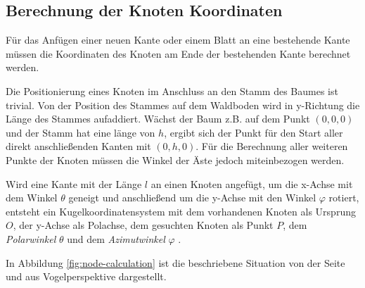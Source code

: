 \subsection{Berechnung der Knoten Koordinaten}

Für das Anfügen einer neuen Kante oder einem Blatt an eine bestehende Kante müssen die Koordinaten des Knoten am Ende der bestehenden Kante berechnet werden.
 
Die Positionierung eines Knoten im Anschluss an den Stamm des Baumes ist trivial. Von der Position des Stammes auf dem Waldboden wird in y-Richtung die Länge des Stammes aufaddiert. Wächst der Baum z.B. auf dem Punkt $(0, 0, 0)$ und der Stamm hat eine länge von $h$, ergibt sich der Punkt für den Start aller direkt anschließenden Kanten mit $(0, h, 0)$. Für die Berechnung aller weiteren Punkte der Knoten müssen die Winkel der Äste jedoch miteinbezogen werden.
  
Wird eine Kante mit der Länge $l$ an einen Knoten angefügt, um die x-Achse mit dem Winkel $\theta$ geneigt und anschließend um die y-Achse mit den Winkel $\varphi$ rotiert, entsteht ein Kugelkoordinatensystem mit dem vorhandenen Knoten als Ursprung $O$, der y-Achse als Polachse, dem gesuchten Knoten als Punkt $P$, dem \emph{Polarwinkel} $\theta$ und dem \emph{Azimutwinkel} $\varphi$ \cite{papula2001mathematik}.

In Abbildung \ref{fig:node-calculation} ist die beschriebene Situation von der Seite und aus Vogelperspektive dargestellt.

